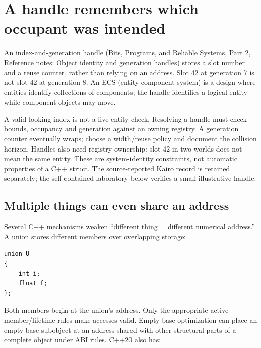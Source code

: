 \section{A handle remembers which occupant was intended}\label{05-engine-i-ch002-a-handle-remembers-which-occupant-was-intended}

\hypertarget{05-engine-i-ch002-a-handle-remembers-which-occupant-was-intended}{}

An \href{../01-Bits-Programs-and-Reliable-Systems-P02/main.pdf\#nameddest=appendix-f1581457d322}{index-and-generation handle (Bits, Programs, and Reliable Systems, Part 2, Reference notes: Object identity and generation handles)} stores a slot number and a reuse counter, rather than relying on an address. Slot 42 at generation 7 is not slot 42 at generation 8. An ECS (entity-component system) is a design where entities identify collections of components; the handle identifies a logical entity while component objects may move.

A valid-looking index is not a live entity check. Resolving a handle must check bounds, occupancy and generation against an owning registry. A generation counter eventually wraps; choose a width/reuse policy and document the collision horizon. Handles also need registry ownership: slot 42 in two worlds does not mean the same entity. These are system-identity constraints, not automatic properties of a C++ struct. The source-reported Kairo record is retained separately; the self-contained laboratory below verifies a small illustrative handle.

\subsection{Multiple things can even share an address}\label{05-engine-i-ch002-multiple-things-can-even-share-an-address}

\hypertarget{05-engine-i-ch002-multiple-things-can-even-share-an-address}{}

Several C++ mechanisms weaken ``different thing = different numerical address.'' A union stores different members over overlapping storage:

\begin{verbatim}
union U
{
    int i;
    float f;
};
\end{verbatim}

Both members begin at the union's address. Only the appropriate active-member/lifetime rules make accesses valid. Empty base optimization can place an empty base subobject at an address shared with other structural parts of a complete object under ABI rules. C++20 also has:

